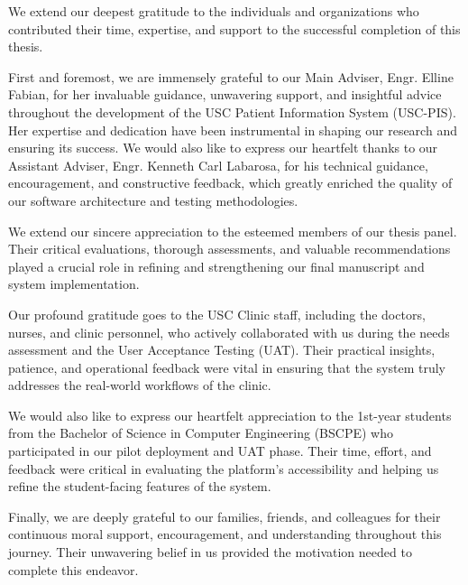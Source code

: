 
\begin{acknowledgments}      

We extend our deepest gratitude to the individuals and organizations who contributed their time, expertise, and support to the successful completion of this thesis.

First and foremost, we are immensely grateful to our Main Adviser, Engr. Elline Fabian, for her invaluable guidance, unwavering support, and insightful advice throughout the development of the USC Patient Information System (USC-PIS). Her expertise and dedication have been instrumental in shaping our research and ensuring its success. We would also like to express our heartfelt thanks to our Assistant Adviser, Engr. Kenneth Carl Labarosa, for his technical guidance, encouragement, and constructive feedback, which greatly enriched the quality of our software architecture and testing methodologies.

We extend our sincere appreciation to the esteemed members of our thesis panel. Their critical evaluations, thorough assessments, and valuable recommendations played a crucial role in refining and strengthening our final manuscript and system implementation.

Our profound gratitude goes to the USC Clinic staff, including the doctors, nurses, and clinic personnel, who actively collaborated with us during the needs assessment and the User Acceptance Testing (UAT). Their practical insights, patience, and operational feedback were vital in ensuring that the system truly addresses the real-world workflows of the clinic.

We would also like to express our heartfelt appreciation to the 1st-year students from the Bachelor of Science in Computer Engineering (BSCPE) who participated in our pilot deployment and UAT phase. Their time, effort, and feedback were critical in evaluating the platform's accessibility and helping us refine the student-facing features of the system.

Finally, we are deeply grateful to our families, friends, and colleagues for their continuous moral support, encouragement, and understanding throughout this journey. Their unwavering belief in us provided the motivation needed to complete this endeavor.

\end{acknowledgments}
